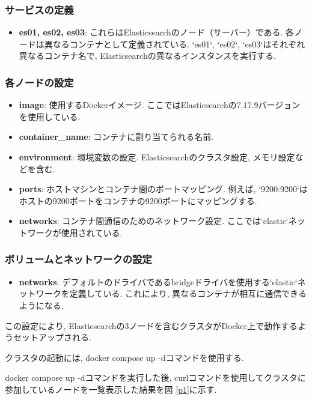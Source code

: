 \documentclass[a4j,12pt,]{jarticle}
\begin{document}
\subsubsection*{サービスの定義}
\begin{itemize}
  \item \textbf{es01, es02, es03}: これらはElasticsearchのノード（サーバー）である. 各ノードは異なるコンテナとして定義されている. `es01`, `es02`, `es03`はそれぞれ異なるコンテナ名で, Elasticsearchの異なるインスタンスを実行する.
\end{itemize}

\subsubsection*{各ノードの設定}
\begin{itemize}
  \item \textbf{image}: 使用するDockerイメージ. ここではElasticsearchの7.17.9バージョンを使用している.
  \item \textbf{container\_name}: コンテナに割り当てられる名前.
  \item \textbf{environment}: 環境変数の設定. Elasticsearchのクラスタ設定, メモリ設定などを含む.
  \item \textbf{ports}: ホストマシンとコンテナ間のポートマッピング. 例えば, `9200:9200`はホストの9200ポートをコンテナの9200ポートにマッピングする.
  \item \textbf{networks}: コンテナ間通信のためのネットワーク設定. ここでは`elastic`ネットワークが使用されている.
\end{itemize}

\subsubsection*{ボリュームとネットワークの設定}
\begin{itemize}
  \item \textbf{networks}: デフォルトのドライバであるbridgeドライバを使用する`elastic`ネットワークを定義している. これにより, 異なるコンテナが相互に通信できるようになる.
\end{itemize}

この設定により, Elasticsearchの3ノードを含むクラスタがDocker上で動作するようセットアップされる.

クラスタの起動には, docker compose up -dコマンドを使用する.

docker compose up -dコマンドを実行した後, curlコマンドを使用してクラスタに参加しているノードを一覧表示した結果を図 \ref{p1}に示す.
\end{document}
